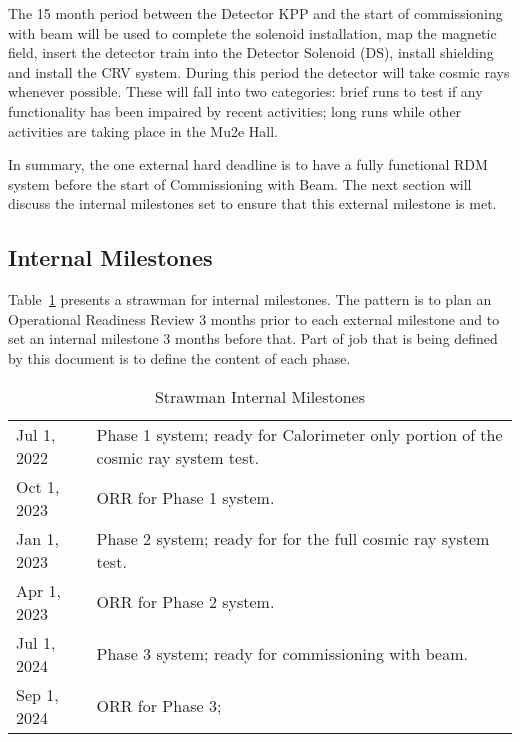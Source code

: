 The 15 month period between the Detector KPP and the start of commissioning with beam will be used
to complete the solenoid installation,
map the magnetic field,
insert the detector train into the Detector Solenoid (DS),
install shielding
and install the CRV system.
During this period the detector will take cosmic rays whenever possible.
These will fall into two categories:
brief runs to test if any functionality has been impaired by recent activities;
long runs while other activities are taking place in the Mu2e Hall.

In summary, the one external hard deadline is to have a fully functional RDM system before the start of
Commissioning with Beam.
The next section will discuss the internal milestones set to ensure that this external milestone is met.

\subsection{Internal Milestones}
\label{ssec:InternalMilestones}

Table~\ref{tab:internalmilestones} presents a strawman for internal milestones.
The pattern is to plan an Operational Readiness Review 3 months prior to each external
milestone and to set an internal milestone 3 months before that.
Part of job that is being defined by this document is to define the content of each phase.


\begin{table}
\begin{center}
\caption[Strawman Internal Milestones]{Strawman Internal Milestones}
\label{tab:internalmilestones}
\begin{tabular}{ll}\hline
  Jul 1, 2022 & Phase 1 system; ready for Calorimeter only portion of the cosmic ray system test. \\
  Oct 1, 2023 & ORR for Phase 1 system. \\
  Jan 1, 2023 & Phase 2 system; ready for for the full cosmic ray system test. \\
  Apr 1, 2023 & ORR for Phase 2 system. \\
  Jul 1, 2024 & Phase 3 system; ready for commissioning with beam. \\
  Sep 1, 2024 & ORR for Phase 3; \\
   \hline
  \end{tabular}
\end{center}
\end{table}


